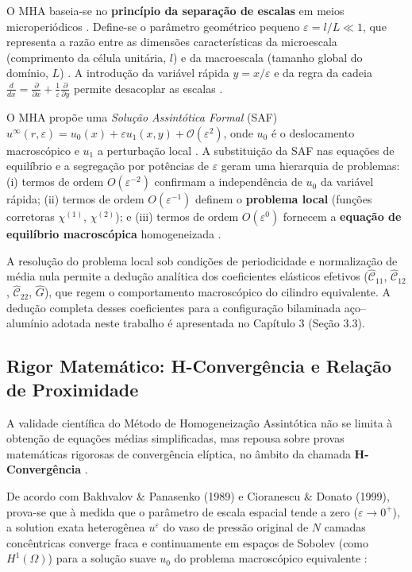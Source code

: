 O MHA baseia-se no \textbf{princípio da separação de escalas} em meios microperiódicos \cite{bakhvalov1989}. Define-se o parâmetro geométrico pequeno $\varepsilon = l/L \ll 1$, que representa a razão entre as dimensões características da microescala (comprimento da célula unitária, $l$) e da macroescala (tamanho global do domínio, $L$) \cite{bakhvalov1989}. A introdução da variável rápida $y = x/\varepsilon$ e da regra da cadeia $\frac{d}{dx} = \frac{\partial}{\partial x} + \frac{1}{\varepsilon}\frac{\partial}{\partial y}$ permite desacoplar as escalas \cite{bakhvalov1989}.

O MHA propõe uma \textit{Solução Assintótica Formal} (SAF) $u^\infty(r,\varepsilon) = u_0(x) + \varepsilon u_1(x,y) + \mathcal{O}(\varepsilon^2)$, onde $u_0$ é o deslocamento macroscópico e $u_1$ a perturbação local \cite{bakhvalov1989}. A substituição da SAF nas equações de equilíbrio e a segregação por potências de $\varepsilon$ geram uma hierarquia de problemas: (i) termos de ordem $O(\varepsilon^{-2})$ confirmam a independência de $u_0$ da variável rápida; (ii) termos de ordem $O(\varepsilon^{-1})$ definem o \textbf{problema local} (funções corretoras $\chi^{(1)}$, $\chi^{(2)}$); e (iii) termos de ordem $O(\varepsilon^0)$ fornecem a \textbf{equação de equilíbrio macroscópica} homogeneizada \cite{bakhvalov1989}.

A resolução do problema local sob condições de periodicidade e normalização de média nula permite a dedução analítica dos coeficientes elásticos efetivos ($\hat{\mathcal{C}}_{11}$, $\hat{\mathcal{C}}_{12}$, $\hat{\mathcal{C}}_{22}$, $\hat{G}$), que regem o comportamento macroscópico do cilindro equivalente. A dedução completa desses coeficientes para a configuração bilaminada aço--alumínio adotada neste trabalho é apresentada no Capítulo 3 (Seção 3.3).

\subsection{Rigor Matemático: H-Convergência e Relação de Proximidade}

A validade científica do Método de Homogeneização Assintótica não se limita à obtenção de equações médias simplificadas, mas repousa sobre provas matemáticas rigorosas de convergência elíptica, no âmbito da chamada \textbf{H-Convergência} \cite{bakhvalov1989}.

De acordo com Bakhvalov \& Panasenko (1989) e Cioranescu \& Donato (1999), prova-se que à medida que o parâmetro de escala espacial tende a zero ($\varepsilon \to 0^+$), a solution exata heterogênea $u^\varepsilon$ do vaso de pressão original de $N$ camadas concêntricas converge fraca e continuamente em espaços de Sobolev (como $H^1(\Omega)$) para a solução suave $u_0$ do problema macroscópico equivalente \cite{bakhvalov1989}:

